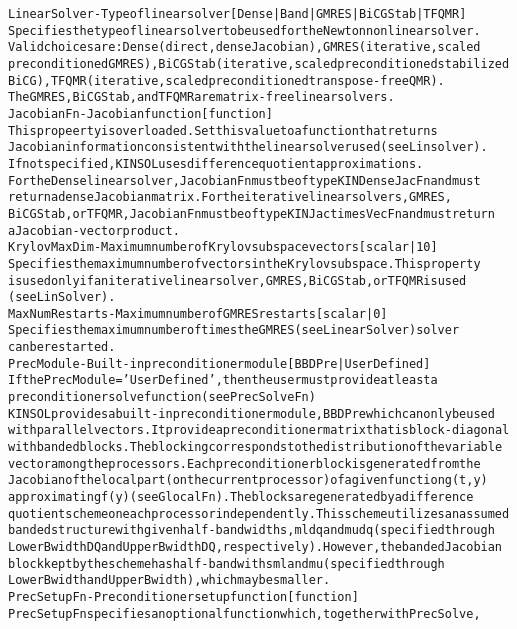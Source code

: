 \begin{alltt}
LinearSolver - Type of linear solver [ {Dense} | Band | GMRES | BiCGStab | TFQMR ]
   Specifies the type of linear solver to be used for the Newton nonlinear solver.
   Valid choices are: Dense (direct, dense Jacobian), GMRES (iterative, scaled
   preconditioned GMRES), BiCGStab (iterative, scaled preconditioned stabilized
   BiCG), TFQMR (iterative, scaled preconditioned transpose-free QMR).
   The GMRES, BiCGStab, and TFQMR are matrix-free linear solvers.
JacobianFn - Jacobian function [ function ]
   This propeerty is overloaded. Set this value to a function that returns
   Jacobian information consistent with the linear solver used (see Linsolver).
   If not specified, KINSOL uses difference quotient approximations.
   For the Dense linear solver, JacobianFn must be of type KINDenseJacFn and must
   return a dense Jacobian matrix. For the iterative linear solvers, GMRES,
   BiCGStab, or TFQMR, JacobianFn must be of type KINJactimesVecFn and must return
   a Jacobian-vector product.
KrylovMaxDim - Maximum number of Krylov subspace vectors [ scalar | {10} ]
   Specifies the maximum number of vectors in the Krylov subspace. This property
   is used only if an iterative linear solver, GMRES, BiCGStab, or TFQMR is used
   (see LinSolver).
MaxNumRestarts - Maximum number of GMRES restarts [ scalar | {0} ]
   Specifies the maximum number of times the GMRES (see LinearSolver) solver
   can be restarted.
PrecModule - Built-in preconditioner module [ BBDPre | {UserDefined} ]
   If the PrecModule = 'UserDefined', then the user must provide at least a
   preconditioner solve function (see PrecSolveFn)
   KINSOL provides a built-in preconditioner module, BBDPre which can only be used
   with parallel vectors. It provide a preconditioner matrix that is block-diagonal
   with banded blocks. The blocking corresponds to the distribution of the variable
   vector among the processors. Each preconditioner block is generated from the
   Jacobian of the local part (on the current processor) of a given function g(t,y)
   approximating f(y) (see GlocalFn). The blocks are generated by a difference
   quotient scheme on each processor independently. This scheme utilizes an assumed
   banded structure with given half-bandwidths, mldq and mudq (specified through
   LowerBwidthDQ and UpperBwidthDQ, respectively). However, the banded Jacobian
   block kept by the scheme has half-bandwiths ml and mu (specified through
   LowerBwidth and UpperBwidth), which may be smaller.
PrecSetupFn - Preconditioner setup function [ function ]
   PrecSetupFn specifies an optional function which, together with PrecSolve,

\end{alltt}
